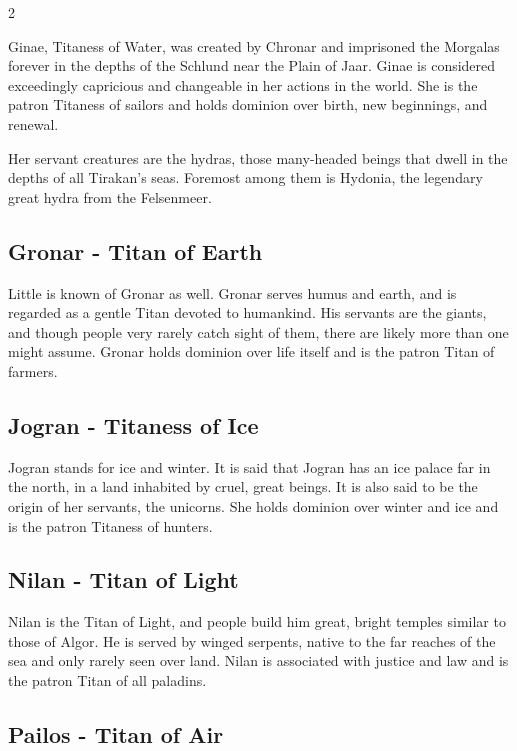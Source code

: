 \begin{multicols}{2}
{Ginae, Titaness of Water, was created by Chronar and imprisoned the Morgalas forever in the depths of the Schlund near the Plain of Jaar. Ginae is considered exceedingly capricious and changeable in her actions in the world. She is the patron Titaness of sailors and holds dominion over birth, new beginnings, and renewal.

Her servant creatures are the hydras, those many-headed beings that dwell in the depths of all Tirakan's seas. Foremost among them is Hydonia, the legendary great hydra from the Felsenmeer.

\subsection{Gronar - Titan of Earth}\label{subsec:gronar-titan-der-erde}

Little is known of Gronar as well. Gronar serves humus and earth, and is regarded as a gentle Titan devoted to humankind. His servants are the giants, and though people very rarely catch sight of them, there are likely more than one might assume. Gronar holds dominion over life itself and is the patron Titan of farmers.

\subsection{Jogran - Titaness of Ice}\label{subsec:jogran-titanin-des-eises}

Jogran stands for ice and winter. It is said that Jogran has an ice palace far in the north, in a land inhabited by cruel, great beings. It is also said to be the origin of her servants, the unicorns. She holds dominion over winter and ice and is the patron Titaness of hunters.

\subsection{Nilan - Titan of Light}\label{subsec:nilan-titan-des-lichts}

Nilan is the Titan of Light, and people build him great, bright temples similar to those of Algor. He is served by winged serpents, native to the far reaches of the sea and only rarely seen over land. Nilan is associated with justice and law and is the patron Titan of all paladins.

\subsection{Pailos - Titan of Air}\label{subsec:pailos-titan-der-luft}

}
\end{multicols}

